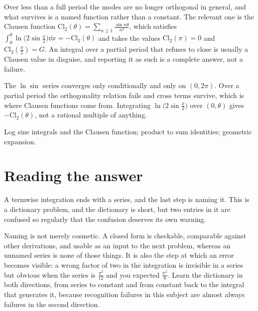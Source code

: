 \begin{keynote}
Over less than a full period the modes are no longer orthogonal in general, and what survives is a named function rather than a constant. The relevant one is the Clausen function $\mathrm{Cl}_2(\theta)=\sum_{n\geq1}\frac{\sin n\theta}{n^{2}}$, which satisfies $\int_0^{\theta}\ln\bigl(2\sin\tfrac x2\bigr)\dd x=-\mathrm{Cl}_2(\theta)$ and takes the values $\mathrm{Cl}_2(\pi)=0$ and $\mathrm{Cl}_2(\tfrac{\pi}{2})=G$. An integral over a partial period that refuses to close is usually a Clausen value in disguise, and reporting it as such is a complete answer, not a failure.
\end{keynote}

\begin{trap}
The $\ln\sin$ series converges only conditionally and only on $(0,2\pi)$. Over a partial period the orthogonality relation fails and cross terms survive, which is where Clausen functions come from. Integrating $\ln\bigl(2\sin\tfrac x2\bigr)$ over $(0,\theta)$ gives $-\mathrm{Cl}_2(\theta)$, not a rational multiple of anything.
\end{trap}

\begin{seealsob}Log sine integrals and the Clausen function; product to sum identities; geometric expansion.\end{seealsob}

\section{Reading the answer}

A termwise integration ends with a series, and the last step is naming it. This is a dictionary problem, and the dictionary is short, but two entries in it are confused so regularly that the confusion deserves its own warning.

Naming is not merely cosmetic. A closed form is checkable, comparable against other derivations, and usable as an input to the next problem, whereas an unnamed series is none of those things. It is also the step at which an error becomes visible: a wrong factor of two in the integration is invisible in a series but obvious when the series is $\tfrac{\pi^{2}}{12}$ and you expected $\tfrac{\pi^{2}}{6}$. Learn the dictionary in both directions, from series to constant and from constant back to the integral that generates it, because recognition failures in this subject are almost always failures in the second direction.

